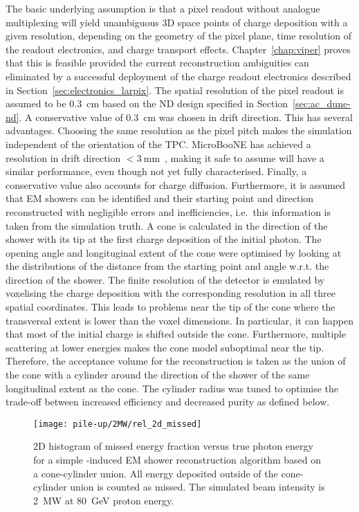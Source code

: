 The basic underlying assumption is that a pixel readout without analogue multiplexing will yield unambiguous 3D space points of charge deposition with a given resolution, depending on the geometry of the pixel plane, time resolution of the readout electronics, and charge transport effects.
Chapter~\ref{chap:viper} proves that this is feasible provided the current reconstruction ambiguities can eliminated by a successful deployment of the \larpix{} charge readout electronics described in Section~\ref{sec:electronics_larpix}.
The spatial resolution of the pixel readout is assumed to be \SI{0.3}{\centi\metre} based on the ND design specified in Section~\ref{sec:ac_dune-nd}.
A conservative value of \SI{0.3}{\centi\meter} was chosen in drift direction.
This has several advantages.
Choosing the same resolution as the pixel pitch makes the simulation independent of the orientation of the TPC.
MicroBooNE has achieved a resolution in drift direction $< \SI{3}{\milli\metre}$~\cite{uboone}, making it safe to assume \larpix{} will have a similar performance, even though not yet fully characterised.
Finally, a conservative value also accounts for charge diffusion.
Furthermore, it is assumed that EM showers can be identified and their starting point and direction reconstructed with negligible errors and inefficiencies, i.e.\ this information is taken from the simulation truth.
A cone is calculated in the direction of the shower with its tip at the first charge deposition of the initial photon.
The opening angle and longituginal extent of the cone were optimised by looking at the distributions of the distance from the starting point and angle w.r.t. the direction of the shower.
The finite resolution of the detector is emulated by voxelising the charge deposition with the corresponding resolution in all three spatial coordinates.
This leads to problems near the tip of the cone where the transversal extent is lower than the voxel dimensions.
In particular, it can happen that most of the initial charge is shifted outside the cone.
Furthermore, multiple scattering at lower energies makes the cone model suboptimal near the tip.
Therefore, the acceptance volume for the reconstruction is taken as the union of the cone with a cylinder around the direction of the shower of the same longitudinal extent as the cone.
The cylinder radius was tuned to optimise the trade-off between increased efficiency and decreased purity as defined below.

\begin{figure}[htb]
	\centering
	\texttt{[image: pile-up/2MW/rel\_2d\_missed]}
	\caption{2D histogram of missed energy fraction versus true photon energy for a simple \Pgpz-induced EM shower reconstruction algorithm based on a cone-cylinder union.
		All energy deposited outside of the cone-cylinder union is counted as missed.
		The simulated beam intensity is \SI{2}{\mega\watt} at \SI{80}{\giga\electronvolt} proton energy.}
	\label{fig:dune-nd_2MW_rel-2d-missed}
\end{figure}

